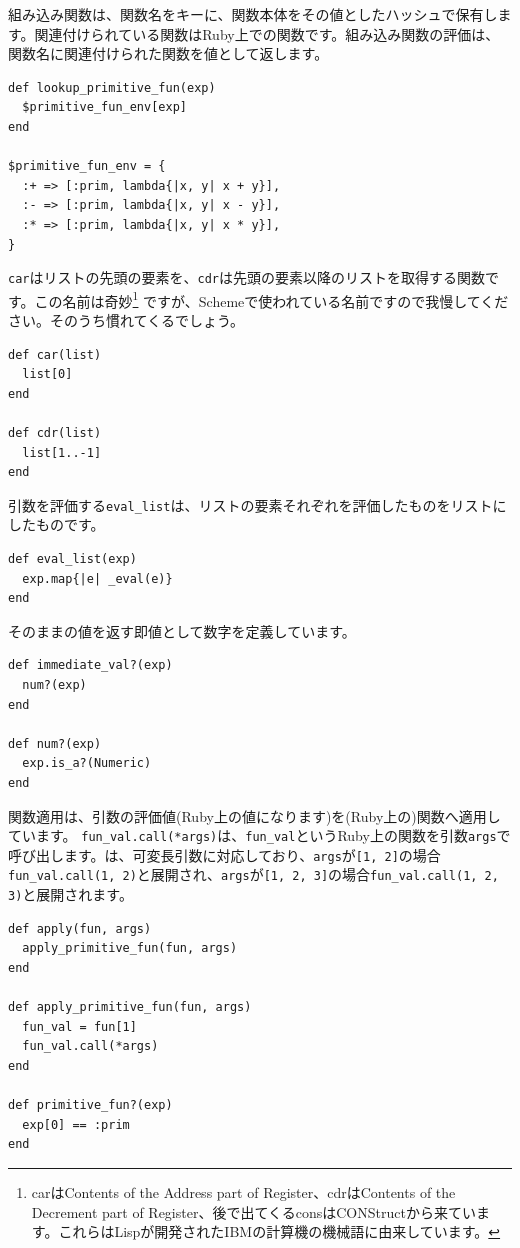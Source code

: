 組み込み関数は、関数名をキーに、関数本体をその値としたハッシュで保有しま
す。関連付けられている関数はRuby上での関数です。組み込み関数の評価は、
関数名に関連付けられた関数を値として返します。

\begin{lstlisting}
def lookup_primitive_fun(exp)
  $primitive_fun_env[exp]
end

$primitive_fun_env = {
  :+ => [:prim, lambda{|x, y| x + y}],
  :- => [:prim, lambda{|x, y| x - y}],
  :* => [:prim, lambda{|x, y| x * y}], 
}
\end{lstlisting}

{\tt car}はリストの先頭の要素を、{\tt cdr}は先頭の要素以降のリストを取得する関数です。この名前は奇妙\footnote{carはContents of the Address part of Register、cdrはContents of the Decrement part of Register、後で出てくるconsはCONStructから来ています。これらはLispが開発されたIBMの計算機の機械語に由来しています。} ですが、Schemeで使われている名前ですので我慢してください。そのうち慣れてくるでしょう。

\begin{lstlisting}
def car(list)
  list[0]
end

def cdr(list)
  list[1..-1]
end
\end{lstlisting}

引数を評価する{\tt eval\_list}は、リストの要素それぞれを評価したものをリストにしたものです。

\begin{lstlisting}
def eval_list(exp)
  exp.map{|e| _eval(e)}
end    
\end{lstlisting}

そのままの値を返す即値として数字を定義しています。

\begin{lstlisting}
def immediate_val?(exp)
  num?(exp) 
end

def num?(exp)
  exp.is_a?(Numeric)
end
\end{lstlisting}

関数適用は、引数の評価値(Ruby上の値になります)を(Ruby上の)関数へ適用しています。
{\tt fun\_val.call(*args)}は、{\tt fun\_val}というRuby上の関数を引数{\tt args}で呼び出します。{\tt *}は、可変長引数に対応しており、{\tt args}が{\tt [1, 2]}の場合{\tt fun\_val.call(1, 2)}と展開され、{\tt args}が{\tt [1, 2, 3]}の場合{\tt fun\_val.call(1, 2, 3)}と展開されます。

\begin{lstlisting}
def apply(fun, args)
  apply_primitive_fun(fun, args)
end

def apply_primitive_fun(fun, args)
  fun_val = fun[1]
  fun_val.call(*args)
end

def primitive_fun?(exp)
  exp[0] == :prim
end
\end{lstlisting}

